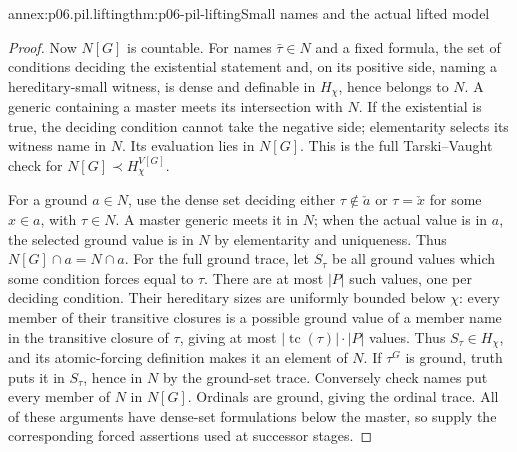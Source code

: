 \begin{annexitem}{annex:p06.pil.lifting}{thm:p06-pil-lifting}{Small names and the actual lifted model}
\begin{proof}
Now \(N[G]\) is countable. For names \(\bar\tau\in N\) and a fixed
formula, the set of conditions deciding the existential statement and,
on its positive side, naming a hereditary-small witness, is dense and
definable in \(H_\chi\), hence belongs to \(N\). A generic containing
a master meets its intersection with \(N\). If the existential is true,
the deciding condition cannot take the negative side; elementarity selects
its witness name in \(N\). Its evaluation lies in \(N[G]\). This is
the full Tarski--Vaught check for \(N[G]\prec H_\chi^{V[G]}\).

For a ground \(a\in N\), use the dense set deciding either
\(\tau\notin\check a\) or \(\tau=\check x\) for some \(x\in a\),
with \(\tau\in N\). A master generic meets it in \(N\); when the
actual value is in \(a\), the selected ground value is in \(N\) by
elementarity and uniqueness. Thus \(N[G]\cap a=N\cap a\).
For the full ground trace, let \(S_\tau\) be all ground values which
some condition forces equal to \(\tau\). There are at most \(|P|\)
such values, one per deciding condition. Their hereditary sizes are
uniformly bounded below \(\chi\): every member of their transitive
closures is a possible ground value of a member name in the transitive
closure of \(\tau\), giving at most
\(|\operatorname{tc}(\tau)|\cdot|P|\) values. Thus \(S_\tau\in H_\chi\),
and its atomic-forcing definition makes it an element of \(N\).
If \(\tau^G\) is ground, truth puts it in \(S_\tau\), hence in \(N\)
by the ground-set trace. Conversely check names put every member of
\(N\) in \(N[G]\). Ordinals are ground, giving the ordinal trace.
All of these arguments have dense-set formulations below the master,
so supply the corresponding forced assertions used at successor stages.
\end{proof}
\end{annexitem}

